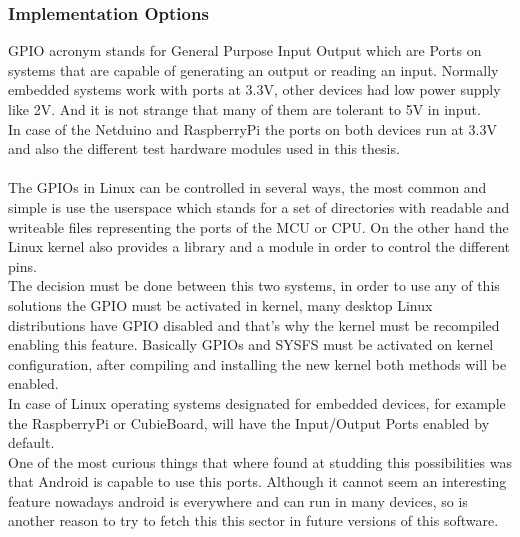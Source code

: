 \subsubsection{Implementation Options}\label{SSS:Implementation-Options}
GPIO acronym stands for General Purpose Input Output which are Ports on systems that are capable of generating an output or reading an input. Normally embedded systems work with ports at 3.3V, other devices had low power supply like 2V. And it is not strange that many of them are tolerant to 5V in input.
\\
In case of the Netduino and RaspberryPi the ports on both devices run at 3.3V and also the different test hardware modules used in this thesis.
\\
\\
The GPIOs in Linux can be controlled in several ways, the most common and simple is use the userspace which stands for a set of directories with readable and writeable files representing the ports of the MCU or CPU. On the other hand the Linux kernel also provides a library and a module in order to control the different pins.
\\
The decision must be done between this two systems, in order to use any of this solutions the GPIO must be activated in kernel, many desktop Linux distributions have GPIO disabled and that's why the kernel must be recompiled enabling this feature. Basically GPIOs and SYSFS must be activated on kernel configuration, after compiling and installing the new kernel both methods will be enabled.
\\
In case of Linux operating systems designated for embedded devices, for example the RaspberryPi or CubieBoard, will have the Input/Output Ports enabled by default.
\\
One of the most curious things that where found at studding this possibilities was that Android is capable to use this ports. Although it cannot seem an interesting feature nowadays android is everywhere and can run in many devices, so is another reason to try to fetch this this sector in future versions of this software.


